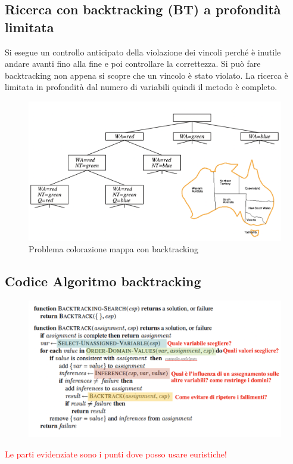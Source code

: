 \documentclass{article}
\begin{document}
\subsection{Ricerca con backtracking (BT) a profondità limitata}
Si esegue un controllo anticipato della violazione dei vincoli perché è inutile andare avanti fino alla fine e poi controllare la correttezza. Si può fare backtracking non appena si scopre che un vincolo è stato violato. La ricerca è limitata in profondità dal numero di variabili quindi il metodo è completo.
\begin{figure}[h!]
\centering
\includegraphics[scale=0.4]{Images/mappacoloratabacktracking.png}
\caption{Problema colorazione mappa con backtracking}
\end{figure}

\subsection{Codice Algoritmo backtracking}
\begin{figure}[h!]
\centering
\includegraphics[scale=0.4]{Images/algoritmobacktracking.png}
\end{figure}
\textcolor{red}{Le parti evidenziate sono i punti dove posso usare euristiche!}
\end{document}
